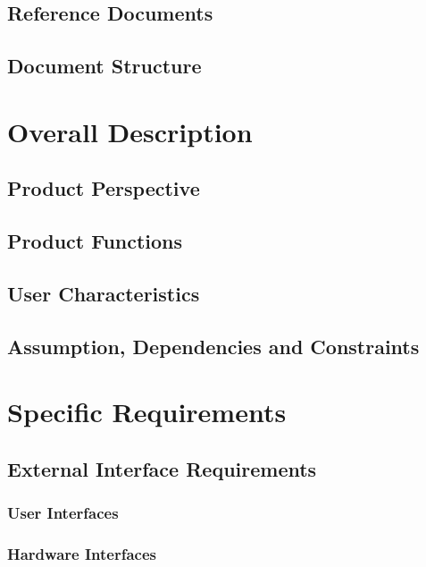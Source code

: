\documentclass[a4paper]{article}
\begin{document}
\subsection{Reference Documents}

\subsection{Document Structure}

\section{Overall Description}

\subsection{Product Perspective}

\subsection{Product Functions}

\subsection{User Characteristics}

\subsection{Assumption, Dependencies and Constraints}

\section{Specific Requirements}

\subsection{External Interface Requirements}

\subsubsection{User Interfaces}

\subsubsection{Hardware Interfaces}
\end{document}
